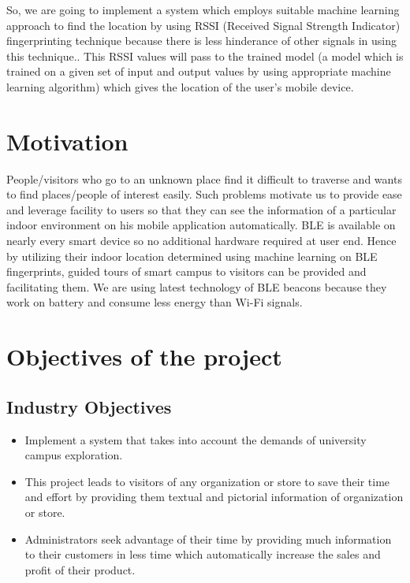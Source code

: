 So, we are going to implement a system which employs suitable machine learning approach to find the location by using RSSI (Received Signal Strength Indicator) fingerprinting technique because there is less hinderance of other signals in using this technique.. This RSSI values will pass to the trained model (a model which is trained on a given set of input and output values by using appropriate machine learning algorithm) which gives the location of the user's mobile device.



\section{Motivation} 
People/visitors who go to an unknown place find it difficult to traverse and wants to find places/people of interest easily. Such problems motivate us to provide ease and leverage facility to users so that they can see the information of a particular indoor environment on his mobile application automatically. BLE is available on nearly every smart device so no additional hardware required at user end. Hence by utilizing their indoor location determined using machine learning on BLE fingerprints, guided tours of smart campus to visitors can be provided and facilitating them. We are using latest technology of BLE beacons because they work on battery and consume less energy than Wi-Fi signals\cite{hultgren2015evaluating}.

\section{Objectives of the project}
\subsection{Industry Objectives}
\begin{itemize}
\item Implement a system that takes into account the demands of university campus exploration.
\item This project leads to visitors of any organization or store to save their time and effort by providing them textual and pictorial information of organization or store.
\item Administrators seek advantage of their time by providing much information to their customers in less time which automatically increase the sales and profit of their product.

\end{itemize}
